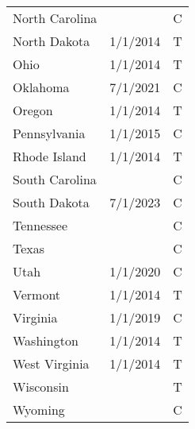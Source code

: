 \begin{table}[ht]
\begin{tabular}{lll}
  North Carolina &  & C \\ 
  North Dakota & 1/1/2014 & T \\ 
  Ohio & 1/1/2014 & T \\ 
  Oklahoma & 7/1/2021 & C \\ 
  Oregon & 1/1/2014 & T \\ 
  Pennsylvania & 1/1/2015 & C \\ 
  Rhode Island & 1/1/2014 & T \\ 
  South Carolina &  & C \\ 
  South Dakota & 7/1/2023 & C \\ 
  Tennessee &  & C \\ 
  Texas &  & C \\ 
  Utah & 1/1/2020 & C \\ 
  Vermont & 1/1/2014 & T \\ 
  Virginia & 1/1/2019 & C \\ 
  Washington & 1/1/2014 & T \\ 
  West Virginia & 1/1/2014 & T \\ 
  Wisconsin &  & T \\ 
  Wyoming &  & C \\ 
   \hline
\end{tabular}
\endgroup
\caption{} 
\end{table}
